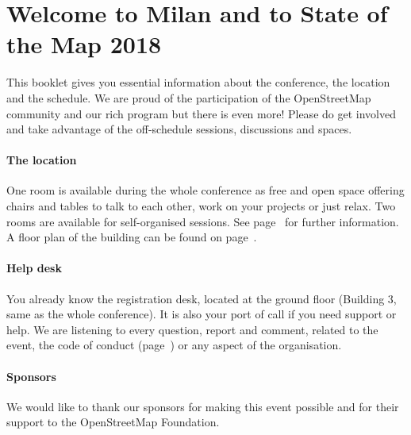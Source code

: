 \newpage
\section*{Welcome to Milan and to State of the Map 2018} \label{welcome}
This booklet gives you essential information
about the conference, the location and the schedule.  We are proud of the participation of the
OpenStreetMap community and our rich program but there is even more!  Please do get involved and
take advantage of the off-schedule sessions, discussions and spaces.

\paragraph*{The location} \label{welcome-location}
One room is available during the whole conference as free and open space offering chairs and tables
to talk to each other, work on your projects or just relax.  Two rooms are available for
self-organised sessions.  See page~\pageref{self-organised} for further information.  A floor plan
of the building can be found on page~\pageref{floorplan}.

\paragraph*{Help desk} \label{welcome-helpdesk}
You already know the registration desk, located at the ground floor (Building 3, same as the whole
conference).  It is also your port of call if you need support or help. We are listening to every
question, report and comment, related to the event, the code of conduct (page~\pageref{coc}) or any
aspect of the organisation.

\paragraph*{Sponsors} \label{welcome-sponsors}
We would like to thank our sponsors for making this event possible and for their support to the
OpenStreetMap Foundation.
\newpage
